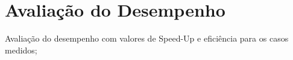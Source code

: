 \section{Avaliação do Desempenho}

	Avaliação do desempenho com valores de Speed-Up e eficiência para os casos 
	medidos;
